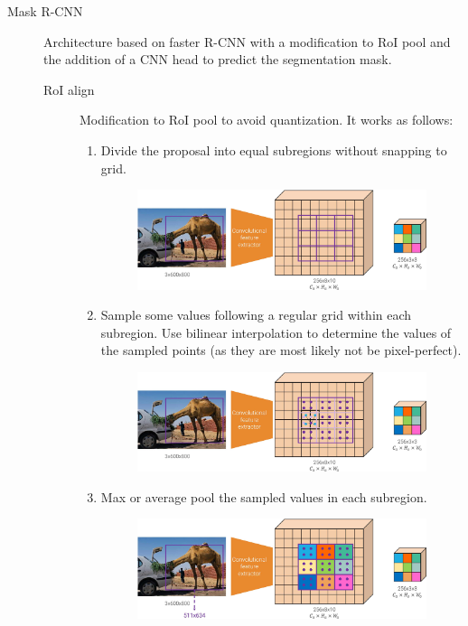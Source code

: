 \begin{description}
    \item[Mask R-CNN] 
        Architecture based on faster R-CNN with a modification to RoI pool and the addition of a CNN head to predict the segmentation mask.

        \begin{description}
            \item[RoI align] 
                Modification to RoI pool to avoid quantization. It works as follows:
                \begin{enumerate}
                    \item Divide the proposal into equal subregions without snapping to grid.
                    \begin{figure}[H]
                        \centering
                        \includegraphics[width=0.7\linewidth]{./img/_roi_align1.jpg}
                    \end{figure}
                    \item Sample some values following a regular grid within each subregion. Use bilinear interpolation to determine the values of the sampled points (as they are most likely not be pixel-perfect).
                    \begin{figure}[H]
                        \centering
                        \includegraphics[width=0.7\linewidth]{./img/_roi_align2.jpg}
                    \end{figure}
                    \item Max or average pool the sampled values in each subregion.
                    \begin{figure}[H]
                        \centering
                        \includegraphics[width=0.7\linewidth]{./img/_roi_align3.jpg}
                    \end{figure}
                \end{enumerate}


\end{description}
\end{description}
